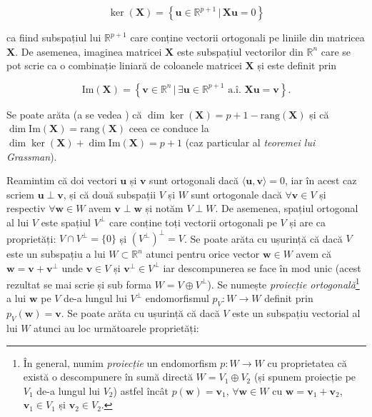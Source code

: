 \documentclass[]{article}
\let\rmarkdownfootnote\footnote%
\def\footnote{\protect\rmarkdownfootnote}
\begin{document}
\[
\ker(\boldsymbol{X}) = \left\{\boldsymbol u\in\mathbb{R}^{p+1}\,|\, \boldsymbol{X}\boldsymbol u = 0\right\}
\]

ca fiind subspațiul lui \(\mathbb{R}^{p+1}\) care conține vectorii
ortogonali pe liniile din matricea \(\boldsymbol{X}\). De asemenea,
imaginea matricei \(\boldsymbol{X}\) este subspațiul vectorilor din
\(\mathbb{R}^n\) care se pot scrie ca o combinație liniară de coloanele
matricei \(\boldsymbol{X}\) și este definit prin

\[
\mathrm{Im}(\boldsymbol{X}) = \left\{\boldsymbol v\in\mathbb{R}^{n}\,|\,\exists \boldsymbol u\in\mathbb{R}^{p+1} \text{ a.î. } \boldsymbol{X}\boldsymbol u = \boldsymbol v\right\}.
\]

Se poate arăta (a se vedea \citep[Capitolul 1]{Turtoi2000}) că
\(\dim \ker(\boldsymbol{X}) = p + 1 - \mathrm{rang}(\boldsymbol{X})\) și
că \(\dim \mathrm{Im}(\boldsymbol{X}) = \mathrm{rang}(\boldsymbol{X})\)
ceea ce conduce la
\(\dim \ker(\boldsymbol{X}) + \dim \mathrm{Im}(\boldsymbol{X}) = p+1\)
(caz particular al \emph{teoremei lui Grassman}).

Reamintim că doi vectori \(\boldsymbol u\) și \(\boldsymbol v\) sunt
ortogonali dacă \(\langle \boldsymbol u, \boldsymbol v\rangle = 0\), iar
în acest caz scriem \(\boldsymbol u \perp \boldsymbol v\), și că două
subspații \(V\) și \(W\) sunt ortogonale dacă
\(\forall \boldsymbol v \in V\) și respectiv
\(\forall \boldsymbol w \in W\) avem
\(\boldsymbol v\perp \boldsymbol w\) și notăm \(V\perp W\). De asemenea,
spațiul ortogonal al lui \(V\) este spațiul \(V^{\perp}\) care conține
toți vectorii ortogonali pe \(V\) și are ca proprietăți:
\(V\cap V^{\perp} = \{0\}\) și \(\left(V^{\perp}\right)^\perp = V\). Se
poate arăta cu ușurință că dacă \(V\) este un subspațiu a lui
\(W\subset\mathbb{R}^n\) atunci pentru orice vector
\(\boldsymbol w\in W\) avem că
\(\boldsymbol w = \boldsymbol v + \boldsymbol v^\perp\) unde
\(\boldsymbol v\in V\) și \(\boldsymbol v^\perp\in V^\perp\) iar
descompunerea se face în mod unic (acest rezultat se mai scrie și sub
forma \(W = V\oplus V^\perp\)). Se numește \emph{proiecție
ortogonală}\footnote{În general, numim \emph{proiecție} un endomorfism
  \(p: W\to W\) cu proprietatea că există o descompunere în sumă directă
  \(W = V_1\oplus V_2\) (și spunem proiecție pe \(V_1\) de-a lungul lui
  \(V_2\)) astfel încât \(p(\boldsymbol w) = \boldsymbol v_1\),
  \(\forall \boldsymbol w\in W\) cu
  \(\boldsymbol w = \boldsymbol v_1 + \boldsymbol v_2\),
  \(\boldsymbol v_1\in V_1\) și \(\boldsymbol v_2\in V_2\).} a lui
\(\boldsymbol w\) pe \(V\) de-a lungul lui \(V^\perp\) endomorfismul
\(p_V: W\to W\) definit prin \(p_V(\boldsymbol w) = \boldsymbol v\). Se
poate arăta cu ușurință că dacă \(V\) este un subspațiu vectorial al lui
\(W\) atunci au loc următoarele proprietăți:
\end{document}
